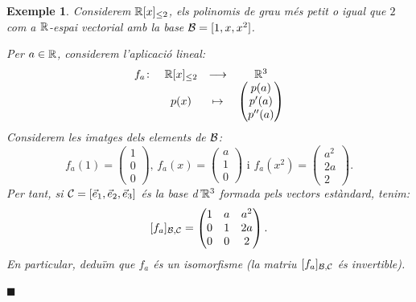 \documentclass[
  11pt,
]{book}
\numberwithin{dummy}{section}
\theoremstyle{maincolornumbox}
\theoremstyle{blacknumex}
\newtheorem{exampleT}{Exemple}[chapter]
\theoremstyle{blacknumbox}
\theoremstyle{maincolornum}
\newenvironment{example}{\begin{exampleT}}{\hfill{\tiny\ensuremath{\blacksquare}}\end{exampleT}}
\newlength\esp
\begin{document}
\begin{example}
Considerem \(\mathbb{R}[x]_{\leq2}\), els polinomis de grau més petit o igual que
\(2\) com a \(\mathbb{R}\)-espai vectorial amb la base \(\mathcal{B}=[1,x,x^2]\).

Per \(a\in \mathbb{R}\), considerem l'aplicació lineal: \[\begin{array}{cccc}
f_a\colon & \mathbb{R}[x]_{\leq2} & \longrightarrow & \mathbb{R}^3 \\
 & p(x) & \mapsto & \begin{pmatrix} p(a) \\ p'(a) \\ p''(a) \end{pmatrix}
\end{array}\] Considerem les imatges dels elements de \(\mathcal{B}\):
\[f_a(1)=\begin{pmatrix} 1 \\ 0 \\ 0 \end{pmatrix}
\text{, }
f_a(x)=\begin{pmatrix} a \\ 1 \\ 0 \end{pmatrix}
\text{ i }
f_a(x^2)=\begin{pmatrix} a^2 \\ 2a \\ 2 \end{pmatrix}.\] Per tant, si
\(\mathcal{C}=[\vec e_1, \vec e_2, \vec e_3]\) és la base d'\(\mathbb{R}^3\) formada pels
vectors estàndard, tenim:
\[[f_a]_{\mathcal{B},\mathcal{C}}=\begin{pmatrix} 1 & a & a^2 \\ 0 & 1 & 2a \\ 0 & 0 & 2\end{pmatrix}.\]
En particular, deduïm que \(f_a\) és un isomorfisme (la matriu
\([f_a]_{\mathcal{B},\mathcal{C}}\) és invertible).


\end{example}
\end{document}
